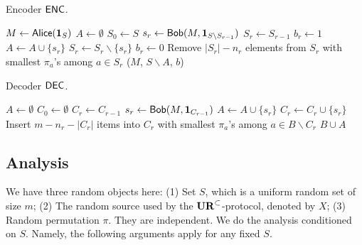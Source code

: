 \begin{algorithm}[H] 
  \caption{Encoder $\textsf{ENC}$.} \label{algo:enc}
  \begin{algorithmic}[1]
    \State $M \leftarrow \mathsf{Alice}(\mathbf{1}_S)$
    \State $A\leftarrow \emptyset$
    \State $S_0 \leftarrow S$
      \State $s_r\leftarrow \mathsf{Bob}(M, \mathbf{1}_{S\backslash S_{r-1}})$
      \State $S_r\leftarrow S_{r-1}$
       
        \State $b_r\leftarrow 1$ 
        \State $A\leftarrow A \cup \{s_r\}$
        \State $S_r\leftarrow S_r \backslash \{s_r\}$
      \Else 
        \State $b_r\leftarrow 0$
      \EndIf
      \State Remove $|S_r|-n_r$ elements from $S_r$ with smallest $\pi_a$'s among $a\in S_r$ 
    \EndFor
    \State \Return ($M$, $S\backslash A$, $b$) 
    \EndProcedure
  \end{algorithmic}
\end{algorithm}

\begin{algorithm}[H] 
  \caption{Decoder $\textsf{DEC}$.} \label{algo:dec}
  \begin{algorithmic}[1]
    \State $A\leftarrow \emptyset$
    \State $C_0 \leftarrow \emptyset$
      \State $C_r\leftarrow C_{r-1}$
        \State $s_r\leftarrow \mathsf{Bob}(M, \mathbf{1}_{C_{r-1}})$ 
        \State $A\leftarrow A \cup \{s_r\}$
        \State $C_r\leftarrow C_r \cup \{s_r\}$
      \EndIf
       \State Insert $m-n_r-|C_r|$ items into $C_r$ with smallest $\pi_a$'s among $a\in B\backslash C_r$
    \EndFor
    \State \Return $B\cup A$ 
    \EndProcedure
  \end{algorithmic}
\end{algorithm}

\subsection{Analysis}

We have three random objects here: 
(1) Set $S$, which is a uniform random set of size $m$; 
(2) The random source used by the $\mathbf{UR}^\subset$-protocol, denoted by $X$; 
(3) Random permutation $\pi$. 
They are independent. 
We do the analysis conditioned on $S$. 
Namely, the following arguments apply for any fixed $S$. 

